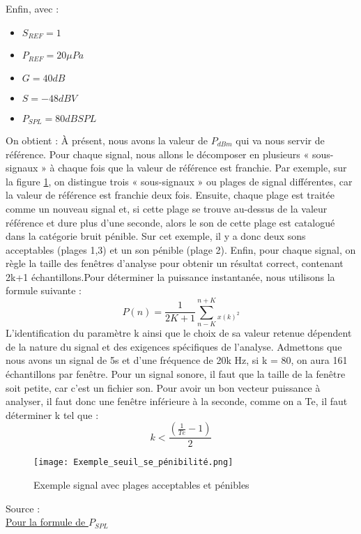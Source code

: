 Enfin, avec : \begin{itemize}
    \item $S_{REF} = 1$
    \item $P_{REF} = 20 \mu Pa$
    \item $G = 40 dB$
    \item $S = -48 dBV$
    \item $P_{SPL} = 80 dB SPL$
\end{itemize} 
On obtient : 
\newline\newline
À présent, nous avons la valeur de $P_{dBm}$ qui va nous servir de référence. Pour chaque signal, nous allons le décomposer en plusieurs « sous-signaux » à chaque fois que la valeur de référence est franchie. 
\newline
Par exemple, sur la figure \ref{Fig.1.2}, on distingue trois « sous-signaux » ou plages de signal différentes, car la valeur de référence est franchie deux fois. Ensuite, chaque plage est traitée comme un nouveau signal et, si cette plage se trouve au-dessus de la valeur référence et dure plus d’une seconde, alors le son de cette plage est catalogué dans la catégorie bruit pénible. Sur cet exemple, il y a donc deux sons acceptables (plages 1,3) et un son pénible (plage 2).
\newline
Enfin, pour chaque signal, on règle la taille des fenêtres d’analyse pour obtenir un résultat correct, contenant 2k+1 échantillons.Pour déterminer la puissance instantanée, nous utilisons la formule suivante :
\begin{equation}
    P(n) = \frac{1}{2K+1}\sum_{n-K}^{n+K}_{x(k)^2}
\end{equation}
L'identification du paramètre k ainsi que le choix de sa valeur retenue dépendent de la nature du signal et des exigences spécifiques de l'analyse. Admettons que nous avons un signal de 5s et d'une fréquence de 20k Hz, si k = 80, on aura 161 échantillons par fenêtre. Pour un signal sonore, il faut que la taille de la fenêtre soit petite, car c'est un fichier son. Pour avoir un bon vecteur puissance à analyser, il faut donc une fenêtre inférieure à la seconde, comme on a Te, il faut déterminer k tel que :
\begin{equation}
    k < \frac{(\frac{1}{Te}-1)}{2}
\end{equation}
\begin{figure}[htb]
    \centering
    \texttt{[image: Exemple\_seuil\_se\_pénibilité.png]}
    \caption{Exemple signal avec plages acceptables et pénibles}
    \label{Fig.1.2}
\end{figure}

\scriptsize{Source :}
\\
\label{(2)} \href{https://fr.wikipedia.org/wiki/Pression_acoustique}{Pour la formule de $P_{SPL}$}
\normalsize